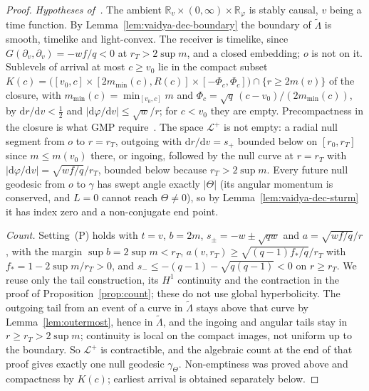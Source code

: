 \documentclass[aip,jmp,amsmath,amssymb,reprint]{revtex4-2}
\newcommand{\dd}{\mathrm{d}}
\theoremstyle{plain}
\theoremstyle{definition}
\begin{document}
\begin{proof}
\emph{Hypotheses of~\cite[Theorem~1.7]{GiannoniMasielloPiccioneMorse}.} The ambient
$\mathbb R_v\times(0,\infty)\times\mathbb R_\varphi$ is stably causal, $v$ being a time function. By
Lemma~\ref{lem:vaidya-dec-boundary} the boundary of $\tilde\Lambda$ is smooth, timelike and light-convex. The
receiver is timelike, since $G(\partial_v,\partial_v)=-wf/q<0$ at $r_T>2\sup m$, and a closed embedding; $o$ is not
on it. Sublevels of arrival at most $c\ge v_0$ lie in the compact subset
$K(c)=\big([v_0,c]\times[2m_{\min}(c),R(c)]\times[-\Phi_c,\Phi_c]\big)\cap\{r\ge2m(v)\}$ of the closure, with
$m_{\min}(c)=\min_{[v_0,c]}m$ and $\Phi_c=\sqrt q\,(c-v_0)/(2m_{\min}(c))$, by $\dd r/\dd v<\frac12$ and
$|\dd\varphi/\dd v|\le\sqrt w/r$; for $c<v_0$ they are empty. Precompactness in the closure is what GMP
require~\cite[Definition~1.2]{GiannoniMasielloPiccioneMorse}.
The space $\mathcal L^+$ is not empty: a radial null segment from $o$ to $r=r_T$, outgoing with
$\dd r/\dd v=s_+$ bounded below on $[r_0,r_T]$ since $m\le m(v_0)$ there, or ingoing, followed by the null
curve at $r=r_T$ with $|\dd\varphi/\dd v|=\sqrt{wf/q}/r_T$, bounded below because $r_T>2\sup m$. Every future null
geodesic from $o$ to $\gamma$ has swept angle exactly $|\Theta|$ (its angular momentum is conserved, and
$L=0$ cannot reach $\Theta\ne0$), so by Lemma~\ref{lem:vaidya-dec-sturm} it has index zero and a non-conjugate
end point.

\emph{Count.} Setting~(P) holds with $t=v$, $b=2m$, $s_\pm=-w\pm\sqrt{qw}$ and $a=\sqrt{wf/q}/r$, with the margin
$\sup b=2\sup m<r_T$, $a(v,r_T)\ge\sqrt{(q-1)f_*/q}/r_T$ with $f_*=1-2\sup m/r_T>0$, and
$s_-\le-(q-1)-\sqrt{q(q-1)}<0$ on $r\ge r_T$. We reuse only the tail construction, its $H^1$ continuity and
the contraction in the proof of Proposition~\ref{prop:count}; these do not use global hyperbolicity.
The outgoing tail from an event of a curve in $\tilde\Lambda$ stays above that curve by
Lemma~\ref{lem:outermost}, hence in $\tilde\Lambda$, and the ingoing and angular tails stay in $r\ge r_T>2\sup m$;
continuity is local on the compact images, not uniform up to the boundary. So $\mathcal L^+$ is
contractible, and the algebraic count at the end of that proof gives exactly one null geodesic
$\gamma_\Theta$. Non-emptiness was proved above and compactness by $K(c)$; earliest arrival is obtained
separately below.


\end{proof}
\end{document}
